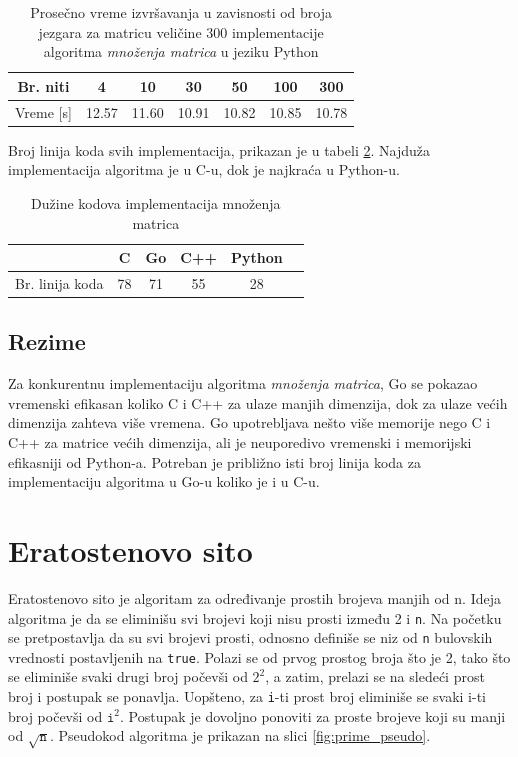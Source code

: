 \documentclass[12pt,oneside]{memoir}
\begin{document}
\begin{table}
\begin{center}
\caption{Prosečno vreme izvršavanja  u zavisnosti od broja jezgara za matricu veličine 300  implementacije algoritma \textit{množenja matrica} u jeziku Python}
\begin{tabular}{||c||c|c|c|c|c|c||}
\hline
Br. niti &4 &10 &30 &50 &100 & 300  \\ \hline
Vreme [s]	&12.57	&11.60	&10.91	 & 10.82	&10.85	&10.78\\ \hline
\end{tabular}
\label{tab:matrix111}
\end{center}
\end{table}


Broj linija koda svih  implementacija, prikazan je u tabeli \ref{tab:matrix2}. Najduža implementacija algoritma je u C-u, dok je najkraća u Python-u.
\begin{table}
\begin{center}
\caption{Dužine kodova implementacija množenja matrica}
\begin{tabular}{|c|c|c|c|c|c|}
\hline
		&  C 	& Go	& C++	& Python	\\ \hline
Br. linija koda& 78	& 71	&55		&28		\\ \hline
\end{tabular}
\label{tab:matrix2}
\end{center}
\end{table}

\subsection{Rezime}

Za konkurentnu implementaciju algoritma \textit{množenja matrica}, Go se pokazao vremenski efikasan koliko C i C++ za ulaze manjih dimenzija, dok za ulaze većih dimenzija zahteva više vremena. Go upotrebljava nešto više memorije nego C i C++ za matrice većih dimenzija, ali je neuporedivo vremenski i memorijski efikasniji od Python-a. Potreban je približno isti broj linija koda za implementaciju algoritma u Go-u koliko je i u C-u.


\section{Eratostenovo sito} \label{erathost}
Eratostenovo sito je algoritam za određivanje prostih brojeva manjih od n. Ideja algoritma je da se eliminišu svi brojevi koji nisu prosti između 2 i \texttt{n}. Na početku se pretpostavlja da su svi brojevi prosti, odnosno definiše se niz od \texttt{n} bulovskih vrednosti postavljenih na \texttt{true}. Polazi se od prvog prostog broja što je 2, tako što se eliminiše svaki drugi broj počevši od $2^{2}$, a zatim, prelazi se na sledeći prost broj i postupak se ponavlja. Uopšteno, za \texttt{i}-ti prost broj eliminiše se svaki i-ti broj počevši od  $\texttt{i}^{2}$. Postupak je dovoljno ponoviti za proste brojeve koji su manji od $\sqrt{\texttt{n}}$. Pseudokod algoritma je prikazan na slici \ref{fig:prime_pseudo}.
\end{document}
